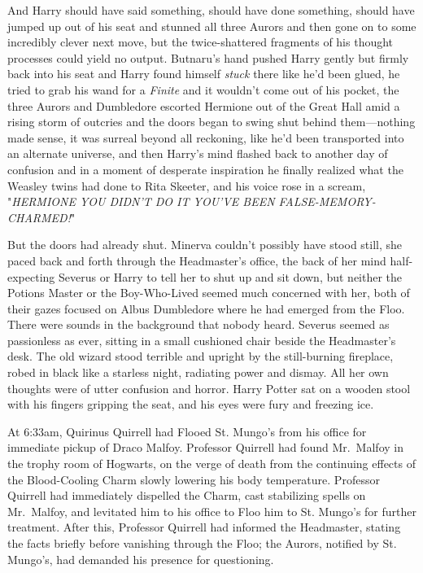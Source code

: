 And Harry should have said something, should have done something, should have 
jumped up out of his seat and stunned all three Aurors and then gone on to some 
incredibly clever next move, but the twice-shattered fragments of his thought 
processes could yield no output. Butnaru's hand pushed Harry gently but firmly 
back into his seat and Harry found himself \emph{stuck} there like he'd been 
glued, he tried to grab his wand for a \emph{Finite} and it wouldn't come out 
of his pocket, the three Aurors and Dumbledore escorted Hermione out of the 
Great Hall amid a rising storm of outcries and the doors began to swing shut 
behind them---nothing made sense, it was surreal beyond all reckoning, like 
he'd been transported into an alternate universe, and then Harry's mind flashed 
back to another day of confusion and in a moment of desperate inspiration he 
finally realized what the Weasley twins had done to Rita Skeeter, and his voice 
rose in a scream, "\emph{HERMIONE YOU DIDN'T DO IT YOU'VE BEEN 
FALSE-MEMORY-CHARMED!}"

But the doors had already shut.
\sbreak
Minerva couldn't possibly have stood still, she paced back and forth through 
the Headmaster's office, the back of her mind half-expecting Severus or Harry 
to tell her to shut up and sit down, but neither the Potions Master or the 
Boy-Who-Lived seemed much concerned with her, both of their gazes focused on 
Albus Dumbledore where he had emerged from the Floo. There were sounds in the 
background that nobody heard. Severus seemed as passionless as ever, sitting in 
a small cushioned chair beside the Headmaster's desk. The old wizard stood 
terrible and upright by the still-burning fireplace, robed in black like a 
starless night, radiating power and dismay. All her own thoughts were of utter 
confusion and horror. Harry Potter sat on a wooden stool with his fingers 
gripping the seat, and his eyes were fury and freezing ice.

At 6:33am, Quirinus Quirrell had Flooed St. Mungo's from his office for 
immediate pickup of Draco Malfoy. Professor Quirrell had found Mr.~Malfoy in 
the trophy room of Hogwarts, on the verge of death from the continuing effects 
of the Blood-Cooling Charm slowly lowering his body temperature. Professor 
Quirrell had immediately dispelled the Charm, cast stabilizing spells on 
Mr.~Malfoy, and levitated him to his office to Floo him to St. Mungo's for 
further treatment. After this, Professor Quirrell had informed the Headmaster, 
stating the facts briefly before vanishing through the Floo; the Aurors, 
notified by St. Mungo's, had demanded his presence for questioning.

